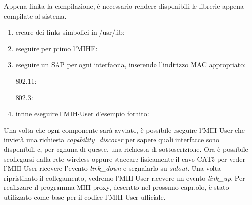 Appena finita la compilazione, è necessario rendere disponibili le librerie appena compilate al sistema.

\begin{enumerate}

\item creare dei links simbolici in /usr/lib:\\

\item eseguire per primo l'MIHF:\\

\item eseguire un SAP per ogni interfaccia, inserendo l'indirizzo MAC appropriato:

802.11:\\

802.3:\\

\item infine eseguire l'MIH-User d'esempio fornito:\\

\end{enumerate}

Una volta che ogni componente sarà avviato, è possibile eseguire l'MIH-User che invierà una richiesta {\em capability\_discover} per sapere quali interfacce sono disponibili e, per ognuna di queste, una richiesta di sottoscrizione. Ora è possibile scollegarsi dalla rete wireless oppure staccare fisicamente il cavo CAT5 per veder l'MIH-User ricevere l'evento {\em link\_down} e segnalarlo su {\em stdout}. Una volta ripristinato il collegamento, vedremo l'MIH-User ricevere un evento {\em link\_up}. Per realizzare il programma MIH-proxy, descritto nel prossimo capitolo, è stato utilizzato come base per il codice l'MIH-User ufficiale.


